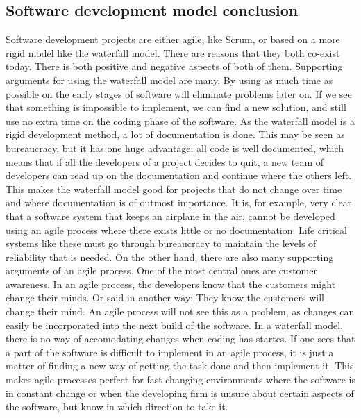 \subsection{Software development model conclusion}
Software development projects are either agile, like Scrum,  or based on a more rigid model like the waterfall model. There are reasons that they both co-exist today. There is both positive and negative aspects of both of them. 
\newline
\newline
Supporting arguments for using the waterfall model are many. By using as much time as possible on the early stages of software will eliminate problems later on. If we see that something is impossible to implement, we can find a new solution, and still use no extra time on the coding phase of the software. 
\newline
\newline
As the waterfall model is a rigid development method, a lot of documentation is done. This may be seen as bureaucracy, but it has one huge advantage; all code is well documented, which means that if all the developers of a project decides to quit, a new team of developers can read up on the documentation and continue where the others left. This makes the waterfall model good for projects that do not change over time and where documentation is of outmost importance. It is, for example, very clear that a software system that keeps an airplane in the air, cannot be developed using an agile process where there exists little or no documentation. Life critical systems like these must go through bureaucracy to maintain the levels of reliability that is needed. 
\newline
\newline
On the other hand, there are also many supporting arguments of an agile process. One of the most central ones are customer awareness. In an agile process, the developers know that the customers might change their minds. Or said in another way: They know the customers will change their mind. An agile process will not see this as a problem, as changes can easily be incorporated into the next build of the software. In a waterfall model, there is no way of accomodating changes when coding has startes. If one sees that a part of the software is difficult to implement in an agile process, it is just a matter of finding a new way of getting the task done and then implement it.  This makes agile processes perfect for fast changing environments where the software is in constant change or when the developing firm is unsure about certain aspects of the software, but know in which direction to take it.  
